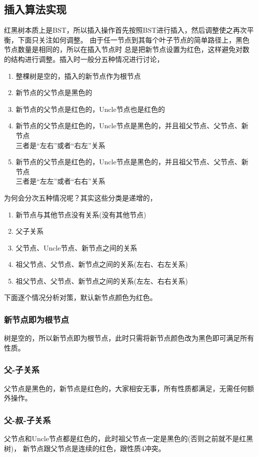 \subsection[插入算法实现]{插入算法实现}
红黑树本质上是BST，所以插入操作首先按照BST进行插入，然后调整使之再次平衡，下面只关注如何调整。
由于任一节点到其每个叶子节点的简单路径上，黑色节点数量是相同的，所以在插入节点时
总是把新节点设置为红色，这样避免对数的结构进行调整。插入时一般分五种情况进行讨论，
\begin{enumerate}
  \item 整棵树是空的，插入的新节点作为根节点
  \item 新节点的父节点是黑色的
  \item 新节点的父节点是红色的，Uncle节点也是红色的
  \item 新节点的父节点是红色的，Uncle节点是黑色的，并且祖父节点、父节点、新节点\\
  三者是“左右”或者“右左”关系
  \item 新节点的父节点是红色的，Uncle节点是黑色的，并且祖父节点、父节点、新节点\\
  三者是“左左”或者“右右”关系
\end{enumerate}
为何会分次五种情况呢？其实这些分类是递增的，
\begin{enumerate}
  \item 新节点与其他节点没有关系(没有其他节点)
  \item 父子关系
  \item 父节点、Uncle节点、新节点之间的关系
  \item 祖父节点、父节点、新节点之间的关系(左右、右左关系)
  \item 祖父节点、父节点、新节点之间的关系(左左、右右关系)
\end{enumerate}
下面逐个情况分析对策，默认新节点颜色为红色。
\subsubsection[新节点即为根节点]{新节点即为根节点}
树是空的，所以新节点即为根节点，此时只需将新节点颜色改为黑色即可满足所有性质。

\subsubsection[父-子关系]{父-子关系}
父节点是黑色的，新节点是红色的，大家相安无事，所有性质都满足，无需任何额外操作。

\subsubsection[父-叔-子关系]{父-叔-子关系}
父节点和Uncle节点都是红色的，此时祖父节点一定是黑色的(否则之前就不是红黑树)，
新节点跟父节点是连续的红色，跟性质4冲突。

